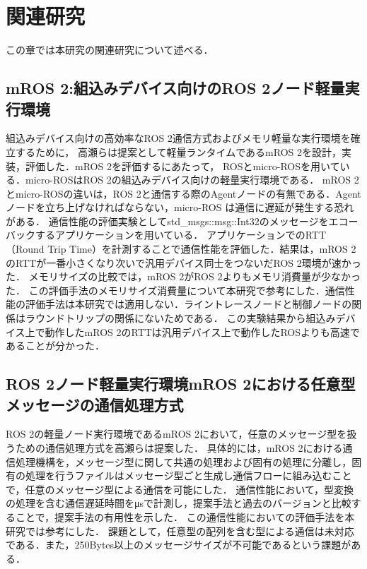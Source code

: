 \chapter{関連研究}
この章では本研究の関連研究について述べる．
\section{mROS 2:組込みデバイス向けのROS 2ノード軽量実行環境}
組込みデバイス向けの高効率なROS 2通信方式およびメモリ軽量な実行環境を確立するために，
高瀬らは提案として軽量ランタイムであるmROS 2を設計，実装，評価した．mROS 2を評価するにあたって，
ROSとmicro-ROSを用いている．micro-ROSはROS 2の組込みデバイス向けの軽量実行環境である．
mROS 2とmicro-ROSの違いは，ROS 2と通信する際のAgentノードの有無である．Agentノードを立ち上げなければならない，micro-ROS は通信に遅延が発生する恐れがある．
通信性能の評価実験としてstd\_msgs::msg::Int32のメッセージをエコーバックするアプリケーションを用いている．
アプリケーションでのRTT（Round Trip Time）を計測することで通信性能を評価した．結果は，mROS 2のRTTが一番小さくなり次いで汎用デバイス同士をつないだROS 2環境が速かった．
メモリサイズの比較では，mROS 2がROS 2よりもメモリ消費量が少なかった．
この評価手法のメモリサイズ消費量について本研究で参考にした．通信性能の評価手法は本研究では適用しない．ライントレースノードと制御ノードの関係はラウンドトリップの関係にないためである．
この実験結果から組込みデバイス上で動作したmROS 2のRTTは汎用デバイス上で動作したROSよりも高速であることが分かった．
\section{ROS 2ノード軽量実行環境mROS 2における任意型メッセージの通信処理方式}
ROS 2の軽量ノード実行環境であるmROS 2において，任意のメッセージ型を扱うための通信処理方式を高瀬らは提案した．
具体的には，mROS 2における通信処理機構を，メッセージ型に関して共通の処理および固有の処理に分離し，固有の処理を行うファイルはメッセージ型ごと生成し通信フローに組み込むことで，任意のメッセージ型による通信を可能にした．
通信性能において，型変換の処理を含む通信遅延時間をμsで計測し，提案手法と過去のバージョンと比較することで，提案手法の有用性を示した．
この通信性能においての評価手法を本研究では参考にした．
課題として，任意型の配列を含む型による通信は未対応である．また，250Bytes以上のメッセージサイズが不可能であるという課題がある．